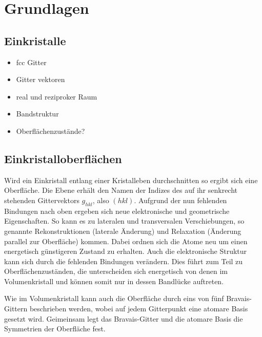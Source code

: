 \chapter{Grundlagen}
    \section{Einkristalle}
        \begin{itemize}
            \item fcc Gitter
            \item Gitter vektoren
            \item real und reziproker Raum
            \item Bandstruktur
            \item Oberflächenzustände?
        \end{itemize}

    \section{Einkristalloberflächen}
        Wird ein Einkristall entlang einer Kristalleben durchschnitten so ergibt sich eine Oberfläche.
        Die Ebene erhält den Namen der Indizes des auf ihr senkrecht stehenden Gittervektors $g_{hkl}$, also $(hkl)$.
        Aufgrund der nun fehlenden Bindungen nach oben ergeben sich neue elektronische und geometrische Eigenschaften.
        So kann es zu lateralen und transversalen Verschiebungen, so genannte Rekonstruktionen (laterale Änderung) und Relaxation (Änderung parallel zur Oberfläche) kommen.
        Dabei ordnen sich die Atome neu um einen energetisch günstigeren Zustand zu erhalten.
        Auch die elektronische Struktur kann sich durch die fehlenden Bindungen verändern.
        Dies führt zum Teil zu Oberflächenzuständen, die unterscheiden sich energetisch von denen im Volumenkristall und können somit nur in dessen Bandlücke auftreten.

        Wie im Volumenkristall kann auch die Oberfläche durch eins von fünf Bravais-Gittern beschrieben werden, wobei auf jedem Gitterpunkt eine atomare Basis gesetzt wird.
        Geimeinsam legt das Bravais-Gitter und die atomare Basis die Symmetrien der Oberfläche fest.


